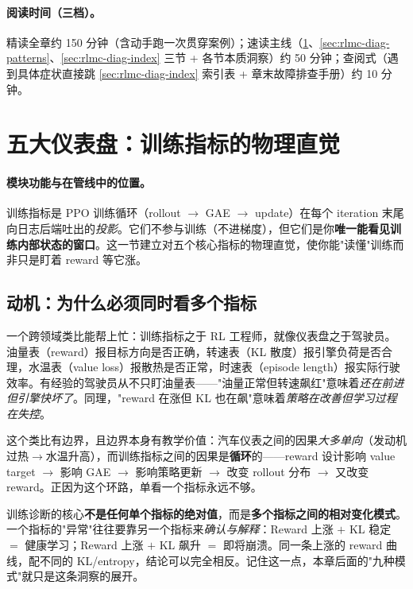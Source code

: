 \paragraph{阅读时间（三档）。}精读全章约 150 分钟（含动手跑一次贯穿案例）；速读主线（\cref{sec:rlmc-diag-dashboards}、\cref{sec:rlmc-diag-patterns}、\cref{sec:rlmc-diag-index} 三节 + 各节本质洞察）约 50 分钟；查阅式（遇到具体症状直接跳 \cref{sec:rlmc-diag-index} 索引表 + 章末故障排查手册）约 10 分钟。

\section{五大仪表盘：训练指标的物理直觉}
\label{sec:rlmc-diag-dashboards}

\paragraph{模块功能与在管线中的位置。}训练指标是 PPO 训练循环（rollout $\to$ GAE $\to$ update）在每个 iteration 末尾向日志后端吐出的\emph{投影}。它们不参与训练（不进梯度），但它们是你\textbf{唯一能看见训练内部状态的窗口}。这一节建立对五个核心指标的物理直觉，使你能"读懂"训练而非只是盯着 reward 等它涨。

\subsection{动机：为什么必须同时看多个指标}

一个跨领域类比能帮上忙：训练指标之于 RL 工程师，就像仪表盘之于驾驶员。油量表（reward）报目标方向是否正确，转速表（KL 散度）报引擎负荷是否合理，水温表（value loss）报散热是否正常，时速表（episode length）报实际行驶效率。有经验的驾驶员从不只盯油量表——"油量正常但转速飙红"意味着\emph{还在前进但引擎快坏了}。同理，"reward 在涨但 KL 也在飙"意味着\emph{策略在改善但学习过程在失控}。

这个类比有边界，且边界本身有教学价值：汽车仪表之间的因果\emph{大多单向}（发动机过热$\to$水温升高），而训练指标之间的因果是\textbf{循环}的——reward 设计影响 value target $\to$ 影响 GAE $\to$ 影响策略更新 $\to$ 改变 rollout 分布 $\to$ 又改变 reward。正因为这个环路，单看一个指标永远不够。

\begin{insight}\label{ins:rlmc-diag-pattern}
训练诊断的核心\textbf{不是任何单个指标的绝对值}，而是\textbf{多个指标之间的相对变化模式}。一个指标的"异常"往往要靠另一个指标来\emph{确认与解释}：Reward 上涨 $+$ KL 稳定 $=$ 健康学习；Reward 上涨 $+$ KL 飙升 $=$ 即将崩溃。同一条上涨的 reward 曲线，配不同的 KL/entropy，结论可以完全相反。记住这一点，本章后面的"九种模式"就只是这条洞察的展开。
\end{insight}

